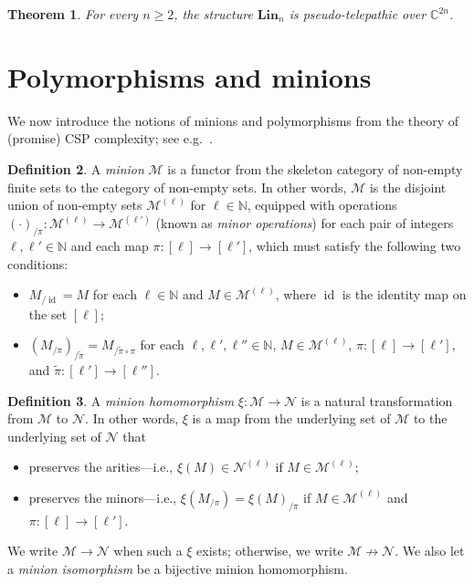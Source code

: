 \documentclass[11pt]{article}
\newcommand{\C}{\mathbb C}
\newcommand{\N}{\mathbb N}
\newcommand{\Lin}{\mathbf{Lin}}
\newcommand{\minion}[1]{{\mathcal #1}}
\theoremstyle{plain}
\newtheorem{theorem}{Theorem}
\theoremstyle{definition}
\newtheorem{definition}[theorem]{Definition}
\theoremstyle{remark}
\begin{document}
\begin{theorem}\label{thm_ain}
For every $n\geq2$,  the structure $\Lin_n$ is pseudo-telepathic over $\C^{2n}$.
\end{theorem}
%
%

\section{Polymorphisms and minions}
\label{sec_minions_pseudo_telepathy}
We now introduce the notions of minions and polymorphisms from the theory of (promise) CSP complexity; see e.g.~\cite{BBKO21}.











\begin{definition}
A \emph{minion} $\minion M$ is a functor from the skeleton category of non-empty finite sets to
the category of non-empty sets. In other words, $\minion M$ is the disjoint union of non-empty sets $\minion M^{(\ell)}$ for $\ell\in\N$, equipped with operations $(\cdot)_{/\pi}:\minion M^{(\ell)}\to \minion M^{(\ell')}$ (known as \emph{minor operations}) for each pair of integers $\ell,\ell'\in\N$ and each map
$\pi:[\ell]\to [\ell']$, which must satisfy the following two conditions:
\begin{itemize}
    \item $M_{/\operatorname{id}}=M$ 
    for each $\ell\in\N$ and $M\in\minion M^{(\ell)}$, where $\operatorname{id}$ is the identity map on the set $[\ell]$;
    \item $(M_{/\pi})_{/\tilde\pi}=M_{/\tilde\pi\circ\pi}$
     for each $\ell,\ell',\ell''\in\N$, $M\in\minion M^{(\ell)}$, $\pi:[\ell]\to[\ell']$,
    and $\tilde\pi:[\ell']\to[\ell'']$.
\end{itemize}
\end{definition}

\begin{definition}
A \emph{minion homomorphism} $\xi:\minion M\to\minion N$ is a natural transformation from $\minion M$ to $\minion N$. In other words, $\xi$ is a map from the underlying set of $\minion M$ to the underlying set of $\minion N$ that
\begin{itemize}
    \item preserves the arities---i.e., $\xi(M)\in\minion N^{(\ell)}$ if $M\in\minion M^{(\ell)}$;
    \item preserves the minors---i.e., $\xi(M_{/\pi})=\xi(M)_{/\pi}$ if $M\in\minion M^{(\ell)}$ and  $\pi:[\ell]\to[\ell']$.
\end{itemize}
We write $\minion M\to\minion N$ when such a $\xi$ exists; otherwise, we write $\minion M\not\to\minion N$. We also let a \textit{minion isomorphism} be a bijective minion homomorphism.
\end{definition}
\end{document}
